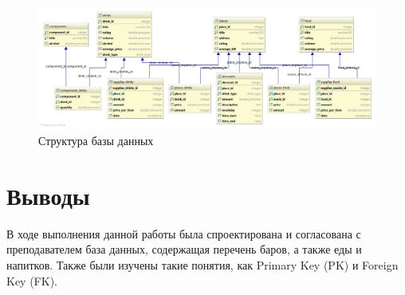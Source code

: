 \begin{figure}[H]
	\begin{center}
		\includegraphics[scale=0.3]{../../structure.png}
		\caption{Структура базы данных} 
		\label{pic:struct} %
	\end{center}
\end{figure}

\section{Выводы}

В ходе выполнения данной работы была спроектирована и согласована с преподавателем база данных, содержащая перечень баров, а также еды и напитков. Также были изучены такие понятия, как Primary Key (PK) и Foreign Key (FK).



